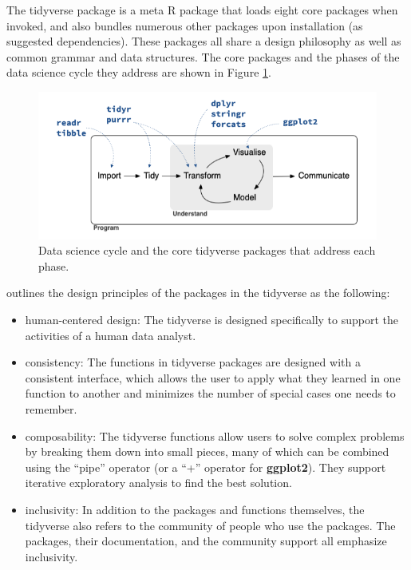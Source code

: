 \documentclass[12pt]{article}
\providecommand{\tightlist}{%
  \setlength{\itemsep}{0pt}\setlength{\parskip}{0pt}}
\begin{document}
The tidyverse package is a meta R package that loads eight core packages
when invoked, and also bundles numerous other packages upon installation
(as suggested dependencies). These packages all share a design
philosophy as well as common grammar and data structures. The core
packages and the phases of the data science cycle they address are shown
in Figure \ref{fig:data-science-cycle}.

\linespread{1}
\begin{figure}

{\centering \includegraphics[width=0.8\linewidth]{images/data-science} 

}

\caption{Data science cycle and the core tidyverse packages that address each phase.}\label{fig:data-science-cycle}
\end{figure}\linespread{2}
\vspace{3mm}\setlength{\parindent}{15pt}

\citet{tidyverse-style} outlines the design principles of the packages
in the tidyverse as the following:

\begin{itemize}
\tightlist
\item
  human-centered design: The tidyverse is designed specifically to
  support the activities of a human data analyst.
\item
  consistency: The functions in tidyverse packages are designed with a
  consistent interface, which allows the user to apply what they learned
  in one function to another and minimizes the number of special cases
  one needs to remember.
\item
  composability: The tidyverse functions allow users to solve complex
  problems by breaking them down into small pieces, many of which can be
  combined using the ``pipe'' operator (or a ``+'' operator for
  \textbf{ggplot2}). They support iterative exploratory analysis to find
  the best solution.
\item
  inclusivity: In addition to the packages and functions themselves, the
  tidyverse also refers to the community of people who use the packages.
  The packages, their documentation, and the community support all
  emphasize inclusivity.
\end{itemize}
\end{document}

